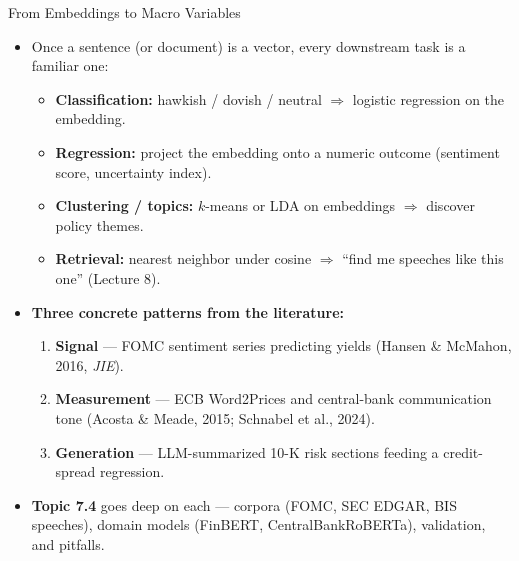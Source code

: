 \begin{frame}{From Embeddings to Macro Variables}
\begin{itemize}
\item Once a sentence (or document) is a vector, every downstream task is a familiar one:
\begin{itemize}
    \item \textbf{Classification:} hawkish / dovish / neutral $\Rightarrow$ logistic regression on the embedding.
    \item \textbf{Regression:} project the embedding onto a numeric outcome (sentiment score, uncertainty index).
    \item \textbf{Clustering / topics:} $k$-means or LDA on embeddings $\Rightarrow$ discover policy themes.
    \item \textbf{Retrieval:} nearest neighbor under cosine $\Rightarrow$ ``find me speeches like this one'' (Lecture 8).
\end{itemize}

\medskip
\item \textbf{Three concrete patterns from the literature:}
\begin{enumerate}
    \item \textbf{Signal} --- FOMC sentiment series predicting yields (Hansen \& McMahon, 2016, \emph{JIE}).
    \item \textbf{Measurement} --- ECB Word2Prices and central-bank communication tone (Acosta \& Meade, 2015; Schnabel et al., 2024).
    \item \textbf{Generation} --- LLM-summarized 10-K risk sections feeding a credit-spread regression.
\end{enumerate}

\medskip
\item \textbf{Topic 7.4} goes deep on each --- corpora (FOMC, SEC EDGAR, BIS speeches), domain models (FinBERT, CentralBankRoBERTa), validation, and pitfalls.
\end{itemize}
\end{frame}

